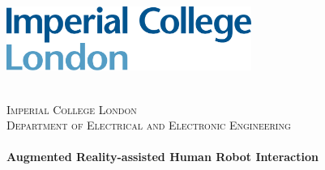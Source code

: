 \begin{titlepage}



\includegraphics[width=8cm]{img/logo.png}\\[1cm] %
 

\center %

\quad\\[1.5cm]
\textsc{\Large Imperial College London}\\[0.5cm] %
\textsc{\large Department of Electrical and Electronic Engineering}\\[0.5cm] %

\makeatletter
\HRule \\[0.4cm]
{ \huge \bfseries Augmented Reality-assisted Human Robot Interaction}\\[0.4cm] %
\HRule \\[1.5cm]
 


\end{titlepage}
